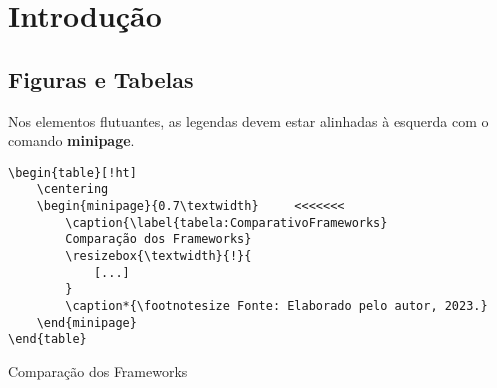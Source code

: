 \chapter{Introdução}

\section{Figuras e Tabelas}
Nos elementos flutuantes, as legendas devem estar alinhadas à esquerda com o comando \textbf{minipage}.

\begin{verbatim}
\begin{table}[!ht]
    \centering
    \begin{minipage}{0.7\textwidth}     <<<<<<<
        \caption{\label{tabela:ComparativoFrameworks}
        Comparação dos Frameworks}
        \resizebox{\textwidth}{!}{
            [...]
        }
        \caption*{\footnotesize Fonte: Elaborado pelo autor, 2023.}
    \end{minipage}
\end{table}
\end{verbatim}

\begin{table}[!ht]
    \centering
    \begin{minipage}{0.7\textwidth}
        \caption{\label{tabela:ComparativoFrameworks}
            Comparação dos Frameworks}
        \caption*{\footnotesize Fonte: Elaborado pelo autor, 2023.}
    \end{minipage}
\end{table}

